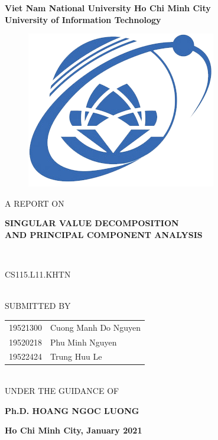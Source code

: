 \documentclass[a4paper, 12pt]{report}
\begin{document}
\begin{titlepage}
\begin{center}
\textup{
\large
\textbf{Viet Nam National University Ho Chi Minh City}\\
\textbf{University of Information Technology}}\\


\begin{center}
\begin{figure}[htbp]  %
\centering
\includegraphics[width=0.3\linewidth]{./logo}
\end{figure}
\end{center}

\textup{\large  A REPORT ON}\\[0.5cm]
\begin{Large}
{\textbf {SINGULAR VALUE DECOMPOSITION}}\\[0.2cm]
{\textbf{AND PRINCIPAL COMPONENT ANALYSIS}}\end{Large}\\[2cm]
\begin{large}\textup {CS115.L11.KHTN}\end{large}\\[0.5cm]
\textup{SUBMITTED BY}\\[0.3cm]
\begin{large}
\begin{tabular}{ c l }
 19521300 & Cuong Manh Do Nguyen \\
 19520218 & Phu Minh Nguyen  \\  
 19522424 & Trung Huu Le  \\ 
\end{tabular}
\end{large}
\\[1cm]\textup{UNDER THE GUIDANCE OF}\\[0.5cm]
\begin{large}\textbf{Ph.D. HOANG NGOC LUONG}\\[3cm]\end{large}
\textbf{Ho Chi Minh City, January 2021}
\vfill
\end{center}
\end{titlepage}
\setcounter{page}{1}
\newpage
\tableofcontents
\end{document}
